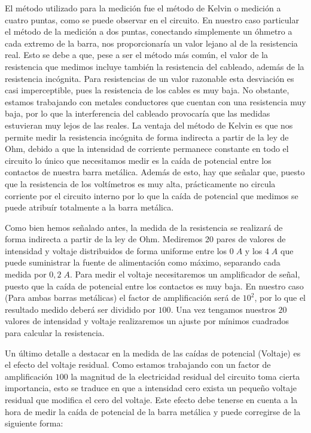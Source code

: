 \documentclass[a4paper,12pt,titlepage]{article}
\begin{document}
El método utilizado para la medición fue el método de Kelvin o medición a cuatro puntas, como se puede observar en el circuito. En nuestro caso particular el método de la medición a dos puntas, conectando simplemente un óhmetro a cada extremo de la barra, nos proporcionaría un valor lejano al de la resistencia real. Esto se debe a que, pese a ser el método más común, el valor de la resistencia que medimos incluye también la resistencia del cableado, además de la resistencia incógnita. Para resistencias de un valor razonable esta desviación es casi imperceptible, pues la resistencia de los cables es muy baja. No obstante, estamos trabajando con metales conductores que cuentan con una resistencia muy baja, por lo que la interferencia del cableado provocaría que las medidas estuvieran muy lejos de las reales. La ventaja del método de Kelvin es que nos permite medir la resistencia incógnita de forma indirecta a partir de la ley de Ohm, debido a que la intensidad de corriente permanece constante en todo el circuito lo único que necesitamos medir es la caída de potencial entre los contactos de nuestra barra metálica. Además de esto, hay que señalar que, puesto que la resistencia de los voltímetros es muy alta, prácticamente no circula corriente por el circuito interno por lo que la caída de potencial que medimos se puede atribuír totalmente a la barra metálica.

\par Como bien hemos señalado antes, la medida de la resistencia se realizará de forma indirecta a partir de la ley de Ohm. Mediremos 20 pares de valores de intensidad y voltaje distribuidos de forma uniforme entre los $0 \; A$ y los $4 \; A$ que puede suministrar la fuente de alimentación como máximo, separando cada medida por $0,2 \; A$. Para medir el voltaje necesitaremos un amplificador de señal, puesto que la caída de potencial entre los contactos es muy baja. En nuestro caso (Para ambas barras metálicas) el factor de amplificación será de $10^2$, por lo que el resultado medido deberá ser dividido por $100$. Una vez tengamos nuestros $20$ valores de intensidad y voltaje realizaremos un ajuste por mínimos cuadrados para calcular la resistencia.

\par Un último detalle a destacar en la medida de las caídas de potencial (Voltaje) es el efecto del voltaje residual. Como estamos trabajando con un factor de amplificación $100$ la magnitud de la electricidad residual del circuito toma cierta importancia, esto se traduce en que a intensidad cero exista un pequeño voltaje residual que modifica el cero del voltaje. Este efecto debe tenerse en cuenta a la hora de medir la caída de potencial de la barra metálica y puede corregirse de la siguiente forma:
\end{document}
